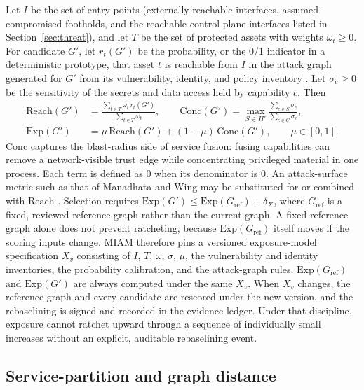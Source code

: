 \documentclass[11pt,letterpaper]{article}
\begin{document}
Let $I$ be the set of entry points (externally reachable interfaces, assumed-compromised footholds, and the reachable control-plane interfaces listed in Section~\ref{sec:threat}), and let $T$ be the set of protected assets with weights $\omega_t\ge0$. For candidate $G'$, let $r_t(G')$ be the probability, or the 0/1 indicator in a deterministic prototype, that asset $t$ is reachable from $I$ in the attack graph generated for $G'$ from its vulnerability, identity, and policy inventory \cite{ou2005mulval}. Let $\sigma_c\ge0$ be the sensitivity of the secrets and data access held by capability $c$. Then
\begin{align}
\mathrm{Reach}(G')&=\frac{\sum_{t\in T}\omega_t\,r_t(G')}{\sum_{t\in T}\omega_t}, \qquad
\mathrm{Conc}(G')=\max_{S\in\Pi'}\frac{\sum_{c\in S}\sigma_c}{\sum_{c\in C}\sigma_c},\label{eq:reach}\\
\mathrm{Exp}(G')&=\mu\,\mathrm{Reach}(G')+(1-\mu)\,\mathrm{Conc}(G'),\qquad \mu\in[0,1].\label{eq:exp}
\end{align}
$\mathrm{Conc}$ captures the blast-radius side of service fusion: fusing capabilities can remove a network-visible trust edge while concentrating privileged material in one process. Each term is defined as 0 when its denominator is 0. An attack-surface metric such as that of Manadhata and Wing may be substituted for or combined with $\mathrm{Reach}$ \cite{manadhata2011}. Selection requires $\mathrm{Exp}(G')\le\mathrm{Exp}(G_{\mathrm{ref}})+\delta_X$, where $G_{\mathrm{ref}}$ is a fixed, reviewed reference graph rather than the current graph. A fixed reference graph alone does not prevent ratcheting, because $\mathrm{Exp}(G_{\mathrm{ref}})$ itself moves if the scoring inputs change. MIAM therefore pins a versioned exposure-model specification $X_v$ consisting of $I$, $T$, $\omega$, $\sigma$, $\mu$, the vulnerability and identity inventories, the probability calibration, and the attack-graph rules. $\mathrm{Exp}(G_{\mathrm{ref}})$ and $\mathrm{Exp}(G')$ are always computed under the same $X_v$. When $X_v$ changes, the reference graph and every candidate are rescored under the new version, and the rebaselining is signed and recorded in the evidence ledger. Under that discipline, exposure cannot ratchet upward through a sequence of individually small increases without an explicit, auditable rebaselining event.

\subsection{Service-partition and graph distance}
\end{document}
